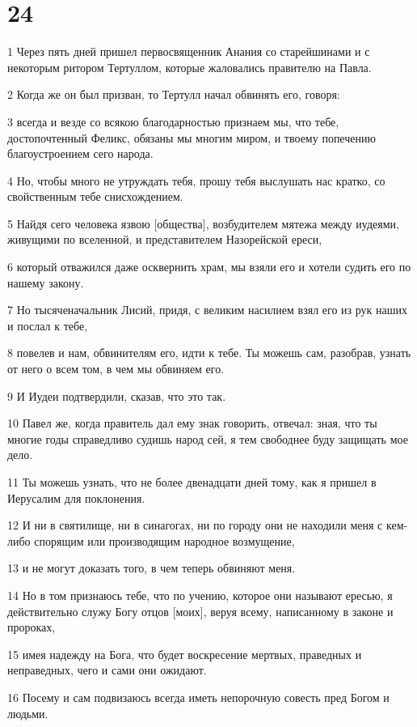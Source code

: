 \chapter{24}

\par 1 Через пять дней пришел первосвященник Анания со старейшинами и с некоторым ритором Тертуллом, которые жаловались правителю на Павла.
\par 2 Когда же он был призван, то Тертулл начал обвинять его, говоря:
\par 3 всегда и везде со всякою благодарностью признаем мы, что тебе, достопочтенный Феликс, обязаны мы многим миром, и твоему попечению благоустроением сего народа.
\par 4 Но, чтобы много не утруждать тебя, прошу тебя выслушать нас кратко, со свойственным тебе снисхождением.
\par 5 Найдя сего человека язвою [общества], возбудителем мятежа между иудеями, живущими по вселенной, и представителем Назорейской ереси,
\par 6 который отважился даже осквернить храм, мы взяли его и хотели судить его по нашему закону.
\par 7 Но тысяченачальник Лисий, придя, с великим насилием взял его из рук наших и послал к тебе,
\par 8 повелев и нам, обвинителям его, идти к тебе. Ты можешь сам, разобрав, узнать от него о всем том, в чем мы обвиняем его.
\par 9 И Иудеи подтвердили, сказав, что это так.
\par 10 Павел же, когда правитель дал ему знак говорить, отвечал: зная, что ты многие годы справедливо судишь народ сей, я тем свободнее буду защищать мое дело.
\par 11 Ты можешь узнать, что не более двенадцати дней тому, как я пришел в Иерусалим для поклонения.
\par 12 И ни в святилище, ни в синагогах, ни по городу они не находили меня с кем-либо спорящим или производящим народное возмущение,
\par 13 и не могут доказать того, в чем теперь обвиняют меня.
\par 14 Но в том признаюсь тебе, что по учению, которое они называют ересью, я действительно служу Богу отцов [моих], веруя всему, написанному в законе и пророках,
\par 15 имея надежду на Бога, что будет воскресение мертвых, праведных и неправедных, чего и сами они ожидают.
\par 16 Посему и сам подвизаюсь всегда иметь непорочную совесть пред Богом и людьми.
